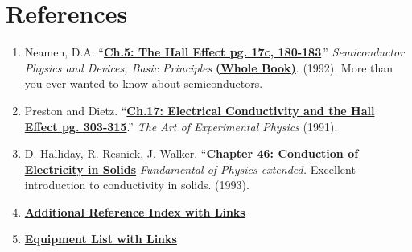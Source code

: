 \documentclass{../lab}
\begin{document}
\section{References}
\label{sec:References}

\begin{enumerate}

    \item Neamen, D.A. ``\href{https://drive.google.com/file/d/14kcn3YzCMqQPhQpJLB5LytHr8uAxdIVK/view?usp=drive_link}{\textbf{Ch.5: The Hall Effect pg. 17c, 180-183}}.'' \emph{Semiconductor Physics and Devices, Basic Principles} \href{https://drive.google.com/file/d/14XBp10gxJ0K1faOC6hGyv5xaHLTQpXwQ/view?usp=drive_link}{\textbf{ (Whole Book)}}. (1992). More than you ever wanted to know about semiconductors.

    \item Preston and Dietz. ``\href{https://drive.google.com/file/d/1A8b3LwI0RFm9lmStbC51-bjuVwoDxKHV/view?usp=drive_link}{\textbf{Ch.17: Electrical Conductivity and the Hall Effect pg. 303-315}}.'' \emph{The Art of Experimental Physics} (1991).

    \item D. Halliday, R. Resnick, J. Walker. ``\href{https://drive.google.com/file/d/1FtLqHI-U8oBQz2Z-OS-fjlL5TBdz8Myi/view?usp=drive_link}{\textbf{Chapter 46: Conduction of Electricity in Solids}} \emph{Fundamental of Physics extended.} Excellent introduction to conductivity in solids. (1993).

    \item \href{https://drive.google.com/file/d/1Z5C1MuOiTkrgxyS_XC_M4uttNVkzjTO6/view?usp=drive_link}{\textbf{Additional Reference Index with Links}}

    \item \href{https://drive.google.com/file/d/1TZyanM3BkkPaplXW_U1YmawLcl-L6qEZ/view?usp=drive_link}{\textbf{Equipment List with Links}}

\end{enumerate}
\end{document}
